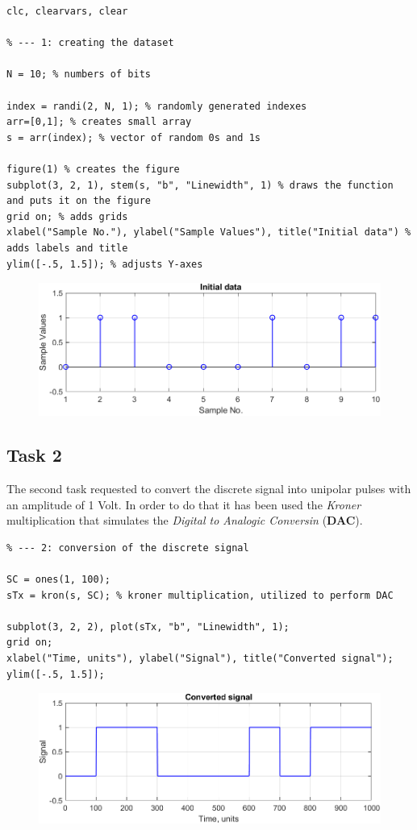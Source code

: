 \begin{lstlisting}
clc, clearvars, clear

% --- 1: creating the dataset

N = 10; % numbers of bits

index = randi(2, N, 1); % randomly generated indexes
arr=[0,1]; % creates small array
s = arr(index); % vector of random 0s and 1s

figure(1) % creates the figure
subplot(3, 2, 1), stem(s, "b", "Linewidth", 1) % draws the function and puts it on the figure
grid on; % adds grids
xlabel("Sample No."), ylabel("Sample Values"), title("Initial data") % adds labels and title
ylim([-.5, 1.5]); % adjusts Y-axes   
\end{lstlisting}
% 
\begin{figure}[h!]
    \centering
    \includegraphics[width = .8\textwidth]{lab-1/imgs/initial_data.png}
\end{figure}

% 
\subsection*{Task 2}
The second task requested to convert the discrete signal into unipolar pulses with an amplitude of 1 Volt. In order to do that it has been used the \textit{Kroner} multiplication that simulates the \textit{Digital to Analogic Conversin} (\textbf{DAC}).
\begin{lstlisting}
% --- 2: conversion of the discrete signal

SC = ones(1, 100); 
sTx = kron(s, SC); % kroner multiplication, utilized to perform DAC

subplot(3, 2, 2), plot(sTx, "b", "Linewidth", 1);
grid on;
xlabel("Time, units"), ylabel("Signal"), title("Converted signal");
ylim([-.5, 1.5]);
\end{lstlisting}

\begin{figure}[h!]
    \centering
    \includegraphics[width = .8\textwidth]{lab-1/imgs/converted_signal.png}
\end{figure}

